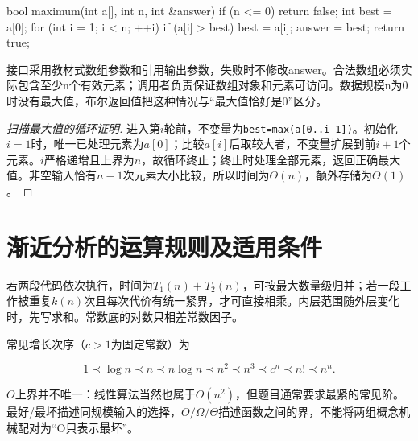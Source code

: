 \par\medskip\noindent\begin{minipage}{\linewidth}
\begin{codeblock}[language=C++]
bool maximum(int a[], int n, int &answer) {
    if (n <= 0) return false;
    int best = a[0];
    for (int i = 1; i < n; ++i)
        if (a[i] > best) best = a[i];
    answer = best;
    return true;
}
\end{codeblock}
\end{minipage}\par\medskip

接口采用教材式数组参数和引用输出参数，失败时不修改answer。合法数组必须实际包含至少n个有效元素；调用者负责保证数组对象和元素可访问。数据规模n为0时没有最大值，布尔返回值把这种情况与``最大值恰好是0''区分。

\begin{proof}[扫描最大值的循环证明]

进入第\(i\)轮前，不变量为\texttt{best=\allowbreak{}max(\allowbreak{}a[\allowbreak{}0.\allowbreak{}.\allowbreak{}i-1]\allowbreak{})\allowbreak{}}。初始化\(i=1\)时，唯一已处理元素为\(a[0]\)；比较\(a[i]\)后取较大者，不变量扩展到前\(i+1\)个元素。\(i\)严格递增且上界为\(n\)，故循环终止；终止时处理全部元素，返回正确最大值。非空输入恰有\(n-1\)次元素大小比较，所以时间为\(\Theta(n)\)，额外存储为\(\Theta(1)\)。

\end{proof}

\section{渐近分析的运算规则及适用条件}\label{DS01-rules}

\begin{theorem}

若两段代码依次执行，时间为\(T_1(n)+T_2(n)\)，可按最大数量级归并；若一段工作被重复\(k(n)\)次且每次代价有统一紧界，才可直接相乘。内层范围随外层变化时，先写求和。常数底的对数只相差常数因子。

\end{theorem}

常见增长次序（\(c>1\)为固定常数）为

\[1\prec\log n\prec n\prec n\log n\prec n^2\prec n^3\prec c^n\prec n!\prec n^n.\]

\(O\)上界并不唯一：线性算法当然也属于\(O(n^2)\)，但题目通常要求最紧的常见阶。最好/最坏描述同规模输入的选择，\(O/\Omega/\Theta\)描述函数之间的界，不能将两组概念机械配对为``O只表示最坏''。


